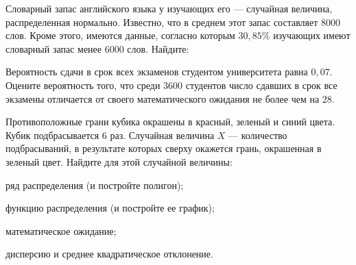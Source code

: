 \vfil

\begin{zkrPlain}{25}\noindent 
	Словарный запас английского языка у изучающих его — случайная величина, распределенная нормально. Известно, что в среднем этот запас составляет 8000 слов. Кроме этого, имеются данные, согласно которым $30{,}85\%$ изучающих имеют словарный запас менее $6000$ слов. Найдите: \par {}
 
\end{zkrPlain}

\vfil

\begin{zkrPlain}{25}\noindent 
	Вероятность сдачи в срок всех экзаменов студентом университета равна $ 0{,}07 $. Оцените вероятность того, что среди $ 3600 $ студентов число сдавших в срок все экзамены отличается от своего математического ожидания не более чем на $ 28 $. 
 
\end{zkrPlain}

\newpage\setcounter{zad}{0}\setcounter{footnote}{0}



\begin{zkrPlain}{25}\noindent 
	Противоположные грани кубика окрашены в красный, зеленый и синий цвета. Кубик подбрасывается 6 раз. Случайная величина $X$ --- количество подбрасываний, в результате которых сверху окажется грань, окрашенная в зеленый цвет.  Найдите для этой случайной величины: \par \smallskip\small{ \par \zz ряд распределения (и постройте полигон); \par \zz функцию распределения (и постройте ее график); \par \zz математическое ожидание; \par \zz дисперсию и среднее квадратическое отклонение.\par \par}
 
\end{zkrPlain}

\vfil

